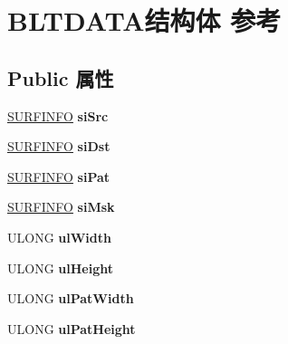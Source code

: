 \hypertarget{struct_b_l_t_d_a_t_a}{}\section{B\+L\+T\+D\+A\+T\+A结构体 参考}
\label{struct_b_l_t_d_a_t_a}
\subsection*{Public 属性}
\begin{DoxyCompactItemize}
\item 
\mbox{\label{struct_b_l_t_d_a_t_a_a2e797e469ef4513af631f62db3a05a6f}} 
\hyperlink{struct_s_u_r_f_i_n_f_o}{S\+U\+R\+F\+I\+N\+FO} {\bfseries si\+Src}
\item 
\mbox{\label{struct_b_l_t_d_a_t_a_abc5ac44262fb0590451b01de50a89fe5}} 
\hyperlink{struct_s_u_r_f_i_n_f_o}{S\+U\+R\+F\+I\+N\+FO} {\bfseries si\+Dst}
\item 
\mbox{\label{struct_b_l_t_d_a_t_a_a2fc289077425c4c1722e8bbc2569def5}} 
\hyperlink{struct_s_u_r_f_i_n_f_o}{S\+U\+R\+F\+I\+N\+FO} {\bfseries si\+Pat}
\item 
\mbox{\label{struct_b_l_t_d_a_t_a_ac72b47d7d9ed04fdf97ef1954f712750}} 
\hyperlink{struct_s_u_r_f_i_n_f_o}{S\+U\+R\+F\+I\+N\+FO} {\bfseries si\+Msk}
\item 
\mbox{\label{struct_b_l_t_d_a_t_a_a979c7b34d8bb838269690a1c8515480a}} 
U\+L\+O\+NG {\bfseries ul\+Width}
\item 
\mbox{\label{struct_b_l_t_d_a_t_a_abfa2932ea2b736d0dfe0e3da9fd771bb}} 
U\+L\+O\+NG {\bfseries ul\+Height}
\item 
\mbox{\label{struct_b_l_t_d_a_t_a_a4a35e960ceff915d731b8ee74753df6c}} 
U\+L\+O\+NG {\bfseries ul\+Pat\+Width}
\item 
\mbox{\label{struct_b_l_t_d_a_t_a_a6ee044d50e49acc5f605cb63ee68f3f4}} 
U\+L\+O\+NG {\bfseries ul\+Pat\+Height}
\item 
\mbox{\label{struct_b_l_t_d_a_t_a_a13fa533fcad7438fb181cbb1a22d7bff}} 

\end{DoxyCompactItemize}
